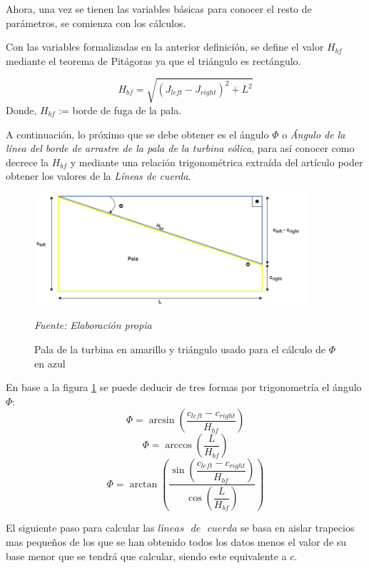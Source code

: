Ahora, una vez se tienen las variables básicas para conocer el resto de parámetros, se comienza con los cálculos.

\begin{definicion}
Con las variables formalizadas en la anterior definición, se define el valor $H_{bf}$ mediante el teorema de Pitágoras ya que el triángulo es rectángulo.

$$ H_{bf} = \sqrt{(J_{left} - J_{right})^{2} + L^{2}}$$
Donde,
\centering
$H_{bf}$ := borde de fuga de la pala.
\label{def_hipotenusa_pala}
\end{definicion}


A continuación, lo próximo que se debe obtener es el ángulo $\Phi$ o \textit{Ángulo de la línea del borde de arrastre de la pala de la turbina eólica}, para así conocer como decrece la $H_{bf}$ y mediante una relación trigonométrica extraída del artículo \cite{armenta2021predictive} poder obtener los valores de la \textit{Líneas de cuerda}.

\begin{figure}[H]
    \centering
    \includegraphics[width=0.9\textwidth]{images/triangulo sacar phi.drawio.png}
    \caption{Pala de la turbina en amarillo y triángulo usado para el cálculo de $\Phi$ en azul}
    \textit{Fuente: Elaboración propia}
    \label{fig:pala_calculo_phi}
\end{figure}

\begin{definicion}
En base a la figura \ref{fig:pala_calculo_phi} se puede deducir de tres formas por trigonometría el ángulo $\Phi$:
$$ \Phi = \arcsin{(\dfrac{c_{left} - c_{right}}{H_{bf}})} $$
$$ \Phi = \arccos{(\dfrac{L}{H_{bf}})} $$
$$ \Phi = \arctan{( \dfrac{\sin{(\dfrac{c_{left} - c_{right}}{H_{bf}})}}{\cos{(\dfrac{L}{H_{bf}})}} ) } $$
\label{def_angulo_phi}
\end{definicion}


El siguiente paso para calcular las $líneas \text{ } de \text{ } cuerda$ se basa en aislar trapecios mas pequeños de los que se han obtenido todos los datos menos el valor de su base menor que se tendrá que calcular, siendo este equivalente a $c$.\\

